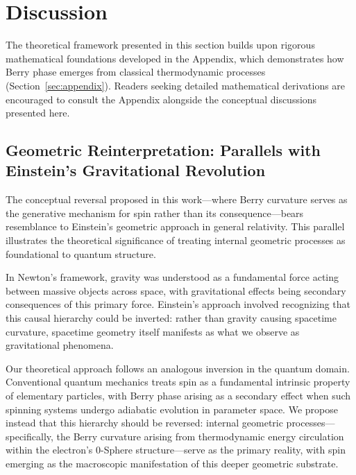 \documentclass[%
 reprint,
 amsmath,amssymb,
 aps,
]{revtex4-1}
\numberwithin{equation}{section}%
\begin{document}
\section{Discussion} \label{sec:discussion}

The theoretical framework presented in this section builds upon rigorous mathematical foundations developed in the Appendix, which demonstrates how Berry phase emerges from classical thermodynamic processes (Section~\ref{sec:appendix}). Readers seeking detailed mathematical derivations are encouraged to consult the Appendix alongside the conceptual discussions presented here.

\subsection{Geometric Reinterpretation: Parallels with Einstein's Gravitational Revolution} \label{subsec:geometric_reinterpretation}

The conceptual reversal proposed in this work—where Berry curvature serves as the generative mechanism for spin rather than its consequence—bears resemblance to Einstein's geometric approach in general relativity. This parallel illustrates the theoretical significance of treating internal geometric processes as foundational to quantum structure.

In Newton's framework, gravity was understood as a fundamental force acting between massive objects across space, with gravitational effects being secondary consequences of this primary force. Einstein's approach involved recognizing that this causal hierarchy could be inverted: rather than gravity causing spacetime curvature, spacetime geometry itself manifests as what we observe as gravitational phenomena.

Our theoretical approach follows an analogous inversion in the quantum domain. Conventional quantum mechanics treats spin as a fundamental intrinsic property of elementary particles, with Berry phase arising as a secondary effect when such spinning systems undergo adiabatic evolution in parameter space. We propose instead that this hierarchy should be reversed: internal geometric processes—specifically, the Berry curvature arising from thermodynamic energy circulation within the electron's 0-Sphere structure—serve as the primary reality, with spin emerging as the macroscopic manifestation of this deeper geometric substrate.
\end{document}
